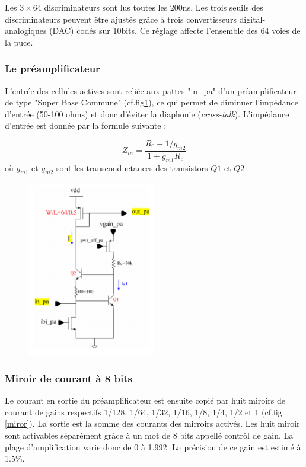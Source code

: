 Les $3\times 64$ discriminateurs sont lus toutes les 200ns. Les trois seuils des discriminateurs peuvent être ajustés grâce à trois convertisseurs digital-analogiques (DAC) codés sur 10bits. Ce réglage affecte l'ensemble des 64 voies de la puce.

\subsubsection{Le préamplificateur}
L'entrée des cellules actives sont reliée aux pattes "in\_pa" d'un préamplificateur de type "Super Base Commune" (cf.fig\ref{preampli}), ce qui permet de diminuer l'impédance d'entrée (50-100 ohms) et donc d'éviter la diaphonie (\textit{cross-talk}). L'impédance d'entrée est donnée par la formule suivante :

\begin{equation}
Z_{in}=\frac{R_0+1/g_{m2}}{1+g_{m1}R_c}
\end{equation}
où $g_{m1}$ et $g_{m2}$ sont les transconductances des transistors $Q1$ et $Q2$ 

\begin{figure}[h!]
	\centering
	\includegraphics[width=0.5\textwidth]{GLA/preampli.png}
	\label{preampli}
\end{figure}

\subsubsection{Miroir de courant à 8 bits}
Le courant en sortie du préamplificateur est ensuite copié par huit miroirs de courant de gains respectifs 1/128, 1/64, 1/32, 1/16, 1/8, 1/4, 1/2 et 1 (cf.fig \ref{miror}). La sortie est la somme des courants des mirroirs activés. Les huit miroir sont activables séparément grâce à un mot de 8 bits appellé contrôl de gain. La plage d'amplification varie donc de 0 à 1.992. La précision de ce gain est estimé à 1.5\%. 

